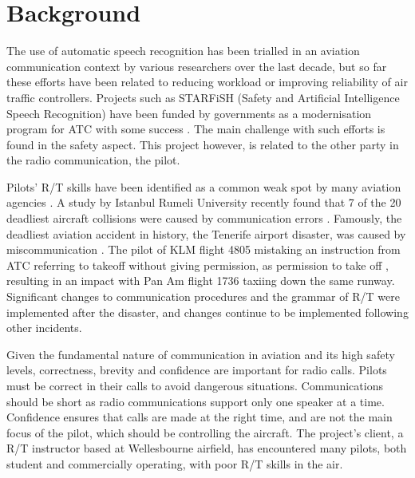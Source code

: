 \section{Background}
\label{sec:background}
The use of automatic speech recognition has been trialled in an aviation communication context by various researchers over the last decade, but so far these efforts have been related to reducing workload or improving reliability of air traffic controllers. Projects such as STARFiSH (Safety and Artificial Intelligence Speech Recognition) have been funded by governments as a modernisation program for ATC with some success \cite{STARFiSH}. The main challenge with such efforts is found in the safety aspect. This project however, is related to the other party in the radio communication, the pilot.


Pilots' R/T skills have been identified as a common weak spot by many aviation agencies \cite{flight-safety-failure-to-communicate}. A study by Istanbul Rumeli University recently found that 7 of the 20 deadliest aircraft collisions were caused by communication errors \cite{communication-in-accidents}. Famously, the deadliest aviation accident in history, the Tenerife airport disaster, was caused by miscommunication \cite{tenerife-accident-description}. The pilot of KLM flight 4805 mistaking an instruction from ATC referring to takeoff without giving permission, as permission to take off \cite{tenerife-accident-description}, resulting in an impact with Pan Am flight 1736 taxiing down the same runway. Significant changes to communication procedures and the grammar of R/T were implemented after the disaster, and changes continue to be implemented following other incidents.

Given the fundamental nature of communication in aviation and its high safety levels, correctness, brevity and confidence are important for radio calls. Pilots must be correct in their calls to avoid dangerous situations. Communications should be short as radio communications support only one speaker at a time. Confidence ensures that calls are made at the right time, and are not the main focus of the pilot, which should be controlling the aircraft. The project's client, a R/T instructor based at Wellesbourne airfield, has encountered many pilots, both student and commercially operating, with poor R/T skills in the air.

